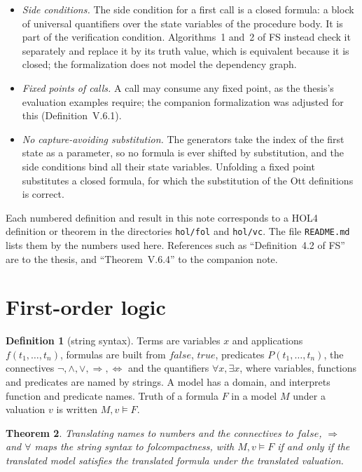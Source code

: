 \documentclass[11pt]{article}
\newcommand{\Th}[1]{#1 of FS}
\theoremstyle{plain}
\newtheorem{theorem}{Theorem}[section]
\theoremstyle{definition}
\newtheorem{definition}[theorem]{Definition}
\theoremstyle{remark}
\begin{document}
\begin{itemize}
  (Theorem~\ref{thm:pcc-set}); \Th{Lemma~4.35} is an instance.
\item \emph{Side conditions.} The side condition for a first call is a
  closed formula: a block of universal quantifiers over the state
  variables of the procedure body. It is part of the verification
  condition. \Th{Algorithms~1 and~2} instead check it separately and
  replace it by its truth value, which is equivalent because it is
  closed; the formalization does not model the dependency graph.
\item \emph{Fixed points of calls.} A call may consume any fixed point,
  as the thesis's evaluation examples require; the companion formalization
  was adjusted for this (Definition~V.6.1).
\item \emph{No capture-avoiding substitution.} The generators take the
  index of the first state as a parameter, so no formula is ever shifted
  by substitution, and the side conditions bind all their state variables.
  Unfolding a fixed point substitutes a closed formula, for which the
  substitution of the Ott definitions is correct.
\end{itemize}

Each numbered definition and result in this note corresponds to a HOL4
definition or theorem in the directories \texttt{hol/fol} and
\texttt{hol/vc}. The file \texttt{README.md} lists them by the numbers used
here. References such as ``\Th{Definition~4.2}'' are to the thesis, and
``Theorem~V.6.4'' to the companion note.

\section{First-order logic}\label{sec:fol}

\begin{definition}[string syntax]\label{def:fol}
  Terms are variables $x$ and applications $f(t_1, \dots, t_n)$, formulas
  are built from $\mathit{false}$, $\mathit{true}$, predicates
  $P(t_1, \dots, t_n)$, the connectives $\neg, \land, \lor, \Rightarrow,
  \Leftrightarrow$ and the quantifiers $\forall x, \exists x$, where
  variables, functions and predicates are named by strings. A model has a
  domain, and interprets function and predicate names. Truth of a formula
  $F$ in a model $M$ under a valuation $v$ is written $M, v \models F$.
\end{definition}

\begin{theorem}\label{thm:fol}
  Translating names to numbers and the connectives to
  $\mathit{false}$, $\Rightarrow$ and $\forall$ maps the string syntax to
  folcompactness, with $M, v \models F$ if and only if the translated model
  satisfies the translated formula under the translated valuation.
\end{theorem}
\end{document}
